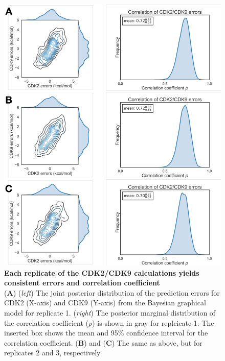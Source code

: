 \documentclass[9pt,lineno]{elife-modified} %
\begin{document}
\begin{figure}[h]
\begin{fullwidth}
\begin{centering}
\includegraphics[width=1.0\linewidth]{figures/supp_figure5.pdf}
\end{centering}
\caption{
\label{fig:sup-figure-5}
{\bf Each replicate of the CDK2/CDK9 calculations yields consistent errors and correlation coefficient} \\
({\bf A}) (\emph{left}) The joint posterior distribution of the prediction errors for CDK2 (X-axis) and CDK9 (Y-axis) from the Bayesian graphical model for replicate 1. (\emph{right}) The posterior marginal distribution of the correlation coefficient ($\rho$) is shown in gray for replcicate 1. The inserted box shows the mean and 95\% confidence interval for the correlation coefficient. ({\bf B}) and ({\bf C}) The same as above, but for replicates 2 and 3, respectively
}
\end{fullwidth}
\end{figure}
\end{document}
